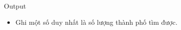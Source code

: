 Output
\begin{itemize}
	\item     Ghi một số duy nhất là số lượng thành phố tìm được.   
\end{itemize}